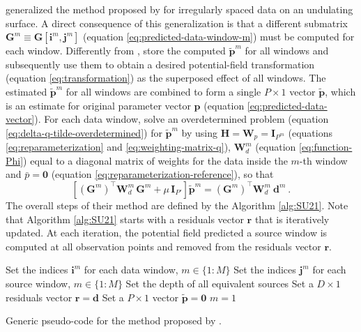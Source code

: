 \cite{soler-uieda2021} generalized the method proposed by \cite{leao-silva1989} for irregularly spaced data on an undulating surface.
A direct consequence of this generalization is that a different submatrix $\mathbf{G}^{m} \equiv \mathbf{G}[\mathbf{i}^{m}, \mathbf{j}^{m}]$ 
(equation \ref{eq:predicted-data-window-m}) must be computed for each window.
Differently from \cite{leao-silva1989}, \cite{soler-uieda2021} store the computed $\tilde{\mathbf{p}}^{m}$ for all windows and
subsequently use them to obtain a desired potential-field transformation (equation \ref{eq:transformation}) as the superposed
effect of all windows.
The estimated $\tilde{\mathbf{p}}^{m}$ for all windows are combined to form a single $P \times 1$ vector $\tilde{\mathbf{p}}$,
which is an estimate for original parameter vector $\mathbf{p}$ (equation \ref{eq:predicted-data-vector}).
For each data window, \cite{soler-uieda2021} solve an overdetermined problem (equation \ref{eq:delta-q-tilde-overdetermined}) 
for $\tilde{\mathbf{p}}^{m}$ by using 
$\mathbf{H} = \mathbf{W}_{p} = \mathbf{I}_{P^{m}}$ (equations \ref{eq:reparameterization} and \ref{eq:weighting-matrix-q}),
$\mathbf{W}^{m}_{d}$ (equation \ref{eq:function-Phi}) equal to a diagonal matrix of weights for the data inside the $m$-th window
and $\bar{p} = \mathbf{0}$ (equation \ref{eq:reparameterization-reference}), so that
\begin{equation}
	\left[ \left( \mathbf{G}^{m} \right)^{\top} \mathbf{W}^{m}_{d} \, \mathbf{G}^{m} + 
	\mu \, \mathbf{I}_{P'} \right] 
	\tilde{\mathbf{p}}^{m} = 
	\left( \mathbf{G}^{m} \right)^{\top} \mathbf{W}^{m}_{d} \: 
	\mathbf{d}^{m} \: .
	\label{eq:p-tilde-m-SU21}
\end{equation}
The overall steps of their method are defined by the Algorithm \ref{alg:SU21}.
Note that Algorithm \ref{alg:SU21} starts with a residuals vector $\mathbf{r}$ that is iteratively updated.
At each iteration, the potential field predicted a source window is computed at all observation points and removed from the
residuals vector $\mathbf{r}$.

\begin{algorithm}
	\Input{}
	Set the indices $\mathbf{i}^{m}$ for each data window, $m \in \{ 1 : M \}$ \;
	Set the indices $\mathbf{j}^{m}$ for each source window, $m \in \{ 1 : M \}$ \;
	Set the depth of all equivalent sources \;
	Set a $D \times 1$ residuals vector $\mathbf{r} = \mathbf{d}$ \;
	Set a $P \times 1$ vector $\tilde{\mathbf{p}} = \mathbf{0}$ \;
	$m = 1$ \;
	\caption{Generic pseudo-code for the method proposed by \cite{soler-uieda2021}.}
	\label{alg:SU21}
\end{algorithm}

